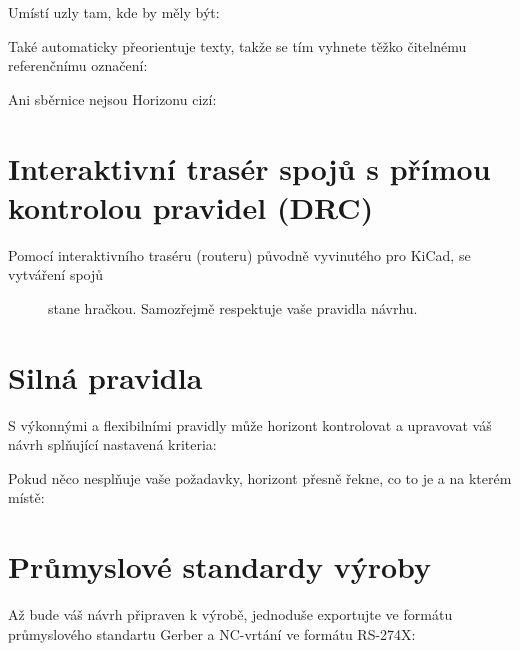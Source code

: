 \documentclass[letterpaper,10pt,czech]{sphinxmanual}
\begin{document}
\noindent{}

Umístí uzly tam, kde by měly být:

\noindent{}

Také automaticky přeorientuje texty, takže se tím vyhnete
těžko čitelnému referenčnímu označení:

\noindent{}

Ani sběrnice nejsou Horizonu cizí:

\noindent{}


\section{Interaktivní trasér spojů s přímou kontrolou pravidel (DRC)}
\label{\detokenize{feature-overview:interaktivni-traser-spoju-s-primou-kontrolou-pravidel-drc}}\begin{description}
\item[{Pomocí interaktivního traséru (routeru) původně vyvinutého pro KiCad, se vytváření spojů}] \leavevmode
stane hračkou. Samozřejmě respektuje vaše pravidla návrhu.

\end{description}

\noindent{}


\section{Silná pravidla}
\label{\detokenize{feature-overview:silna-pravidla}}
S výkonnými a flexibilními pravidly může horizont kontrolovat a upravovat váš
návrh splňující nastavená kriteria:

\noindent{}

Pokud něco nesplňuje vaše požadavky, horizont přesně řekne, co to je a
na kterém místě:

\noindent{}


\section{Průmyslové standardy výroby}
\label{\detokenize{feature-overview:prumyslove-standardy-vyroby}}
Až bude váš návrh připraven k výrobě, jednoduše exportujte ve formátu
průmyslového standartu Gerber a NC-vrtání ve formátu RS-274X:

\noindent{}
\end{document}
